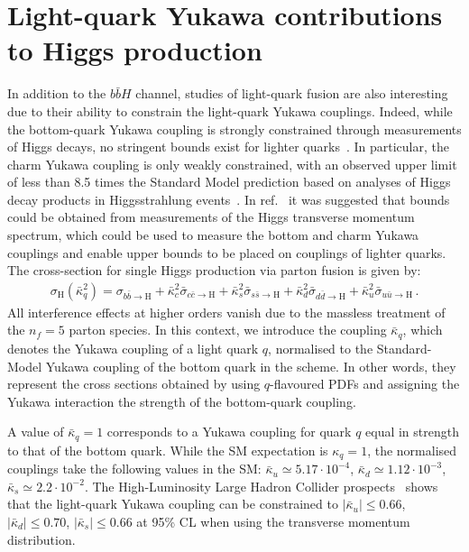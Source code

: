 \documentclass[11pt,a4paper]{article}
\begin{document}
\section{Light-quark Yukawa contributions to Higgs production}\label{sec:lightYukawa}
In addition to the $b\bar{b}H$ channel, studies of light-quark fusion are also interesting due to their ability to constrain the light-quark Yukawa couplings. Indeed, while the bottom-quark Yukawa coupling is strongly constrained through measurements of Higgs decays, no stringent bounds exist for lighter quarks~\cite{Kagan:2014ila}. In particular, the charm Yukawa coupling is only weakly constrained, with an observed upper limit of less than 8.5 times the Standard Model prediction based on analyses of Higgs decay products in Higgsstrahlung events~\cite{Atlas:2022ers}. In ref.~\cite{Bishara:2016jga} it was suggested that bounds could be obtained from measurements of the Higgs transverse momentum spectrum, which could be used to measure the bottom and charm Yukawa couplings and  enable upper bounds to be placed on couplings of lighter quarks. The cross-section for single Higgs production via parton fusion is given by:
\begin{align}
\sigma_{\text{H}}(\bar \kappa_q^2)=\sigma_{b\bar b \rightarrow \text{H}}+\bar \kappa_c^2 \bar \sigma_{c\bar c \rightarrow \text{H}}+\bar \kappa_s^2 \bar \sigma_{s\bar s \rightarrow \text{H}}+\bar \kappa_d^2 \bar \sigma_{d\bar d \rightarrow \text{H}}+\bar \kappa_u^2 \bar \sigma_{u\bar u \rightarrow \text{H}}\,.
\end{align}
All interference effects at higher orders vanish due to the massless treatment of the \( n_f = 5 \) parton species. In this context, we introduce the coupling \( \bar\kappa_q \), which denotes the Yukawa coupling of a light quark \( q \), normalised to the Standard-Model Yukawa coupling of the bottom quark in the \MSbar{} scheme. In other words, they represent the cross sections obtained by using \( q \)-flavoured PDFs and assigning the Yukawa interaction the strength of the bottom-quark coupling.

A value of \( \bar\kappa_q = 1 \) corresponds to a Yukawa coupling for quark \( q \) equal in strength to that of the bottom quark. While the SM expectation is \( \kappa_q = 1 \), the normalised couplings take the following values in the SM:  
\( \bar \kappa_u \simeq 5.17 \cdot 10^{-4} \),  
\( \bar \kappa_d \simeq 1.12 \cdot 10^{-3} \),  
\( \bar \kappa_s \simeq 2.2 \cdot 10^{-2} \).
The High-Luminosity Large Hadron Collider prospects~\cite{deBlas:2019rxi} shows that the light-quark Yukawa coupling can be constrained to $|\bar \kappa_u|\leq 0.66$, $|\bar \kappa_d|\leq 0.70$, $|\bar \kappa_s|\leq 0.66$ at 95\% CL when using the transverse momentum distribution.
\end{document}
